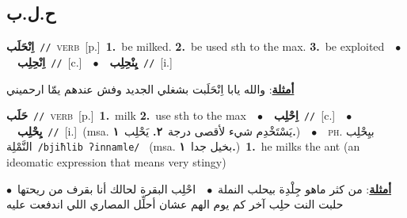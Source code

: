 \documentclass[10pt,a4paper,twoside]{article} %
\begin{document}
\begin{multicols}{2}
\vspace{-3mm}
\subsection*{\color{blue}\foreignlanguage{arabic}{ح.ل.ب}\color{blue}{}} 

{\setlength\topsep{0pt}\textbf{\foreignlanguage{arabic}{اِنْحَلَب}}\ {\color{gray}\texttt{//}\color{black}}\ \textsc{verb}\ [p.]\ \textbf{1.}~be milked.  \textbf{2.}~be used sth to the max.  \textbf{3.}~be exploited\ \ $\bullet$\ \ \setlength\topsep{0pt}\textbf{\foreignlanguage{arabic}{اِنْحِلِب}}\ {\color{gray}\texttt{//}\color{black}}\ [c.]\ \ $\bullet$\ \ \setlength\topsep{0pt}\textbf{\foreignlanguage{arabic}{يِنْحِلِب}}\ {\color{gray}\texttt{//}\color{black}}\ [i.]\  \begin{flushright}\color{gray}\foreignlanguage{arabic}{\textbf{\underline{\foreignlanguage{arabic}{أمثلة}}}: والله يابا اِنْحَلَبت بشغلي الجديد وفش عندهم يمّا ارحميني}\end{flushright}\color{black}} \vspace{2mm}

{\setlength\topsep{0pt}\textbf{\foreignlanguage{arabic}{حَلَب}}\ {\color{gray}\texttt{//}\color{black}}\ \textsc{verb}\ [p.]\ \textbf{1.}~milk  \textbf{2.}~use sth to the max\ \ $\bullet$\ \ \setlength\topsep{0pt}\textbf{\foreignlanguage{arabic}{اِحْلِب}}\ {\color{gray}\texttt{//}\color{black}}\ [c.]\ \ $\bullet$\ \ \setlength\topsep{0pt}\textbf{\foreignlanguage{arabic}{يِحْلِب}}\ {\color{gray}\texttt{//}\color{black}}\ [i.]\ \color{gray}(msa. \foreignlanguage{arabic}{يَسْتَخْدِم شيء لأقصى درجة}~\foreignlanguage{arabic}{\textbf{٢.}}  \foreignlanguage{arabic}{يَحْلِب}~\foreignlanguage{arabic}{\textbf{١.}})\color{black}\ \ $\bullet$\ \ \textsc{ph.} \color{gray} \foreignlanguage{arabic}{بيِحْلِب النَّمْلِة}\color{black}\ {\color{gray}\texttt{/{\sffamily bjiħlib ʔinnamle}/}\color{black}}\ \color{gray} (msa. \foreignlanguage{arabic}{بخيل جدا}~\foreignlanguage{arabic}{\textbf{١.}})\color{black}\ \textbf{1.}~he milks the ant (an ideomatic expression that means very stingy)\  \begin{flushright}\color{gray}\foreignlanguage{arabic}{\textbf{\underline{\foreignlanguage{arabic}{أمثلة}}}: من كثر ماهو جِلْدِة بيحلب النملة\ $\bullet$\ \  احْلِب البقرة لحالك أنا بقرف من ريحتها\ $\bullet$\ \  حلبت النت حلِب آخر كم يوم الهم عشان أحلِّل المصاري اللي اندفعت عليه}\end{flushright}\color{black}} \vspace{2mm}


\end{multicols}
\end{document}
